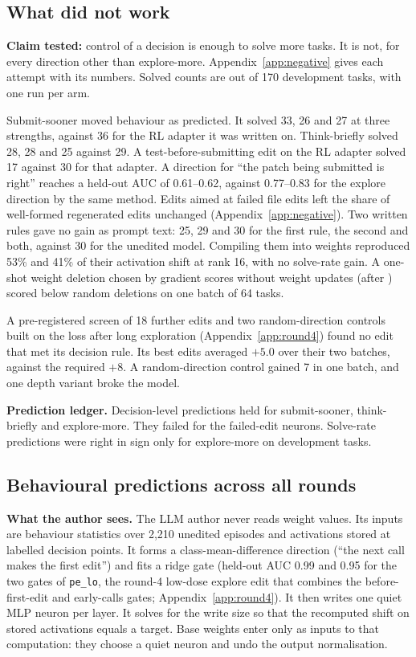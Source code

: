 \subsection{What did not work}
\label{sec:negative}
\textbf{Claim tested:} control of a decision is enough to solve more tasks. It is not, for every direction other than explore-more. Appendix~\ref{app:negative} gives each attempt with its numbers. Solved counts are out of 170 development tasks, with one run per arm.

Submit-sooner moved behaviour as predicted. It solved 33, 26 and 27 at three strengths, against 36 for the RL adapter it was written on. Think-briefly solved 28, 28 and 25 against 29. A test-before-submitting edit on the RL adapter solved 17 against 30 for that adapter. A direction for ``the patch being submitted is right'' reaches a held-out AUC of 0.61--0.62, against 0.77--0.83 for the explore direction by the same method. Edits aimed at failed file edits left the share of well-formed regenerated edits unchanged (Appendix~\ref{app:negative}). Two written rules gave no gain as prompt text: 25, 29 and 30 for the first rule, the second and both, against 30 for the unedited model. Compiling them into weights reproduced 53\% and 41\% of their activation shift at rank 16, with no solve-rate gain. A one-shot weight deletion chosen by gradient scores without weight updates (after \citealp{Lu2026SurprisingEffectiveness}) scored below random deletions on one batch of 64 tasks.

A pre-registered screen of 18 further edits and two random-direction controls built on the loss after long exploration (Appendix~\ref{app:round4}) found no edit that met its decision rule. Its best edits averaged $+5.0$ over their two batches, against the required $+8$. A random-direction control gained 7 in one batch, and one depth variant broke the model.

\textbf{Prediction ledger.} Decision-level predictions held for submit-sooner, think-briefly and explore-more. They failed for the failed-edit neurons. Solve-rate predictions were right in sign only for explore-more on development tasks.


\subsection{Behavioural predictions across all rounds}
\label{sec:behav}
\textbf{What the author sees.} The LLM author never reads weight values. Its inputs are behaviour statistics over 2,210 unedited episodes and activations stored at labelled decision points. It forms a class-mean-difference direction (``the next call makes the first edit'') and fits a ridge gate (held-out AUC 0.99 and 0.95 for the two gates of \texttt{pe\_lo}, the round-4 low-dose explore edit that combines the before-first-edit and early-calls gates; Appendix~\ref{app:round4}). It then writes one quiet MLP neuron per layer. It solves for the write size so that the recomputed shift on stored activations equals a target. Base weights enter only as inputs to that computation: they choose a quiet neuron and undo the output normalisation.

